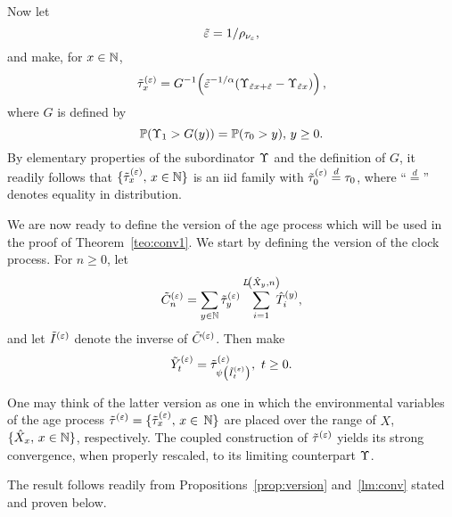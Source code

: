 Now let 
\begin{equation}
  \label{eq:te}
\te=1/\rho_{\nu_\eps},
\end{equation}
 and make, for $x\in{\mathbb N}$,
\begin{equation}
  \label{eq:taue}
  \tilde\tau_x^{(\eps)}=G^{-1}\!\left(\te^{-1/\a}(\ups_{\te x+\te}-\ups_{\te x})\right),
\end{equation}
where $G$ is defined by
\begin{equation}
  \label{eq:G}
  \P(\ups_1>G(y))=\P(\tau_0>y),\,y\geq0.
\end{equation}
By elementary properties of the subordinator $\Upsilon$ and the definition of $G$, it readily follows that
$\{\tilde\tau_x^{(\varepsilon)},\,x\in{\mathbb N}\}$ is an iid family with $\tilde\tau_0^{(\varepsilon)}\stackrel{d}=\tau_0$, 
where ``$\stackrel{d}=$'' denotes equality in distribution.


We are now ready to define the version of the age process which will be used in the proof of Theorem~\ref{teo:conv1}. 
We start by defining the version of the clock process. For $n\geq0$, let
\begin{equation}
\label{eq:bclock}
\tilde C^{(\eps)}_n=\sum_{y\in\N} \tilde\tau_{y}^{(\eps)}
\sum_{i=1}^{L\!\left(\txt_{y},n\right)}\!\!\!\hat T^{(y)}_i,
\end{equation} 
and let $\tilde I^{(\varepsilon)}$ denote the inverse of $\tilde C^{(\varepsilon)}$. Then make
\begin{equation}
\label{eq:bye}
\tilde Y^{(\eps)}_t=%
\tilde\tau^{(\eps)}_{\psi\left(\tilde I^{(\eps)}_t\right)},\,\,t\geq0.
\end{equation}


\begin{rmk}
 \label{rmk:expl}
One may think of the latter version as one in which the environmental variables of the age process
$\tilde\tau^{(\varepsilon)}=\{\tilde\tau_{x}^{(\varepsilon)},\,x\in\,{\mathbb N}\}$
are placed over the range of $X$, $\{\hat X_{x},\,x\in{\mathbb N}\}$, respectively.
The coupled construction of $\tilde\tau^{(\varepsilon)}$ yields its strong convergence, when properly rescaled,
to its limiting counterpart $\Upsilon$.
\end{rmk}




The result follows readily from Propositions~\ref{prop:version} and~\ref{lm:conv} stated and proven below.


